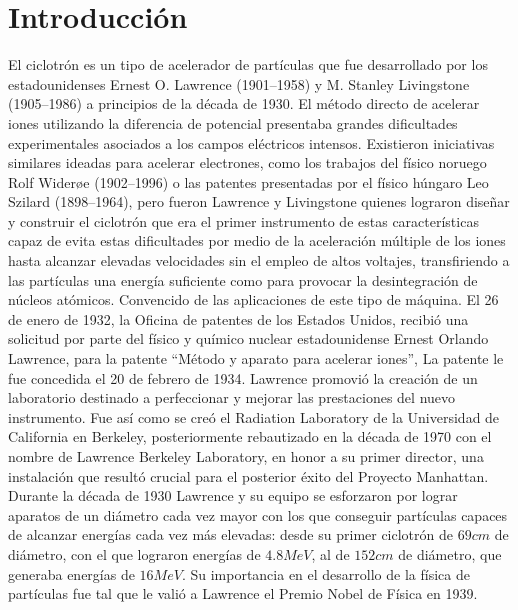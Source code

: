 \documentclass[12pt]{article}
\begin{document}
		\section*{\centering Introducción}\label{sec:Introducción}
		El ciclotrón es un tipo de acelerador de partículas que fue desarrollado por los estadounidenses 
		Ernest O. Lawrence (1901–1958) y M. Stanley Livingstone (1905–1986) a principios de la década de 
		1930. El método directo de acelerar iones utilizando la diferencia de potencial presentaba grandes 
		dificultades experimentales asociados a los campos eléctricos intensos. Existieron iniciativas 
		similares ideadas para acelerar electrones, como los trabajos del físico noruego Rolf Widerøe 
		(1902–1996) o las patentes presentadas por el físico húngaro Leo Szilard (1898–1964), pero fueron 
		Lawrence y Livingstone quienes lograron diseñar y construir el ciclotrón que era el primer 
		instrumento de estas características capaz de evita estas dificultades por medio de la aceleración 
		múltiple de los iones hasta alcanzar elevadas velocidades sin el empleo de altos voltajes, 
		transfiriendo a las partículas una energía suficiente como para provocar la desintegración de 
		núcleos atómicos. Convencido de las aplicaciones de este tipo de máquina. El 26 de enero de 
		1932, la Oficina de patentes de los Estados Unidos, recibió una solicitud por parte del físico y 
		químico nuclear estadounidense Ernest Orlando Lawrence, para la patente “Método y aparato 
		para acelerar iones”, La patente le fue concedida el 20 de febrero de 1934. Lawrence promovió la 
		creación de un laboratorio destinado a perfeccionar y mejorar las prestaciones del nuevo 
		instrumento. Fue así como se creó el Radiation Laboratory de la Universidad de California en 
		Berkeley, posteriormente rebautizado en la década de 1970 con el nombre de Lawrence Berkeley 
		Laboratory, en honor a su primer director, una instalación que resultó crucial para el posterior 
		éxito del Proyecto Manhattan. Durante la década de 1930 Lawrence y su equipo se esforzaron por 
		lograr aparatos de un diámetro cada vez mayor con los que conseguir partículas capaces de 
		alcanzar energías cada vez más elevadas: desde su primer ciclotrón de $ 69 cm $ de diámetro, con 
		el que lograron energías de $ 4.8 MeV $, al de $ 152 cm $ de diámetro, que generaba energías de 
		$ 16 MeV $. Su importancia en el desarrollo de la física de partículas fue tal que le valió a 
		Lawrence el Premio Nobel de Física en 1939. 
\end{document}
